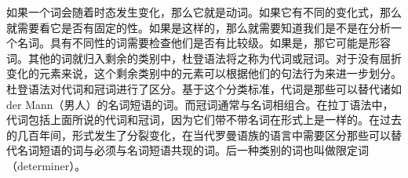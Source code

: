 如果一个词会随着时态发生变化，那么它就是动词。如果它有不同的变化式，那么就需要看它是否有固定的性。如果是这样的，那么就需要知道我们是不是在分析一个名词。具有不同性的词需要检查他们是否有比较级。如果是，那它可能是形容词。其他的词就归入剩余的类别中，杜登语法将之称为代词或冠词。对于没有屈折变化的元素来说，这个剩余类别中的元素可以根据他们的句法行为来进一步划分。杜登语法对代词和冠词进行了区分。基于这个分类标准，代词是那些可以替代诸如der Mann（男人）的名词短语的词。而冠词通常与名词相组合。在拉丁语法中，代词包括上面所说的代词和冠词，因为它们带不带名词在形式上是一样的。在过去的几百年间，形式发生了分裂变化，在当代罗曼语族的语言中需要区分那些可以替代名词短语的词与必须与名词短语共现的词。后一种类别的词也叫做限定词（determiner）。


